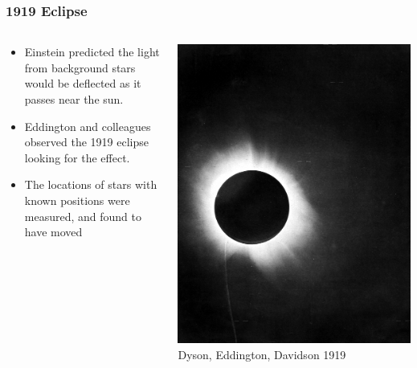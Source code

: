 \documentclass{beamer}
\begin{document}
    \frame
    {
        \frametitle{1919 Eclipse}

        \begin{columns}
            \begin{column}{0.5\textwidth}    
                \begin{itemize}

                    \item Einstein predicted the light from background stars would
                        be deflected as it passes near the sun.

                    \item Eddington and colleagues observed the 1919 eclipse
                        looking for the effect.

                    \item The locations of stars with known positions were
                        measured, and found to have moved

                \end{itemize}
            \end{column}
            \begin{column}{0.5\textwidth}
                \begin{center}
                    \includegraphics[width=\textwidth]{1919_eclipse_positive.jpg}
                    \newline
                    {\tiny Dyson, Eddington, Davidson 1919}
                \end{center}
            \end{column}
        \end{columns}
    }
\end{document}
